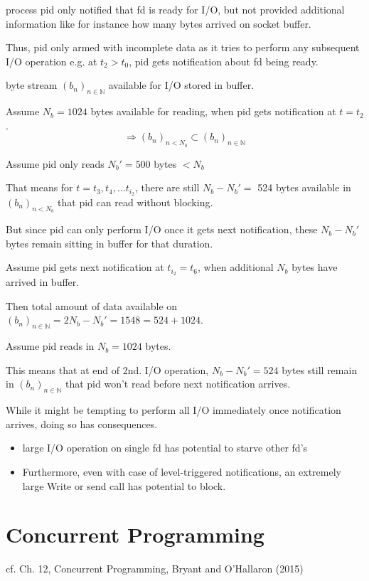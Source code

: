 \documentclass[10pt]{amsart}
\begin{document}
\begin{multicols*}{2}
process pid only notified that fd is ready for I/O, but not provided additional information like for instance how many bytes arrived on socket buffer.

Thus, pid only armed with incomplete data as it tries to perform any subsequent I/O operation 
e.g. 
 at $t_2 > t_0$, pid gets notification about fd being ready.
 
 byte stream $(b_n)_{n\in \mathbb{N}}$ available for I/O stored in buffer.
 
 Assume $N_b = 1024$ bytes available for reading, when pid gets notification at $t= t_2$. 
 \[
 \Longrightarrow (b_n)_{n <N_b} \subset (b_n)_{n\in \mathbb{N}}
 \]
 
Assume pid only reads $N_b' = 500$ bytes $<N_b$

That means for $t=t_3, t_4, \dots t_{i_2}$, there are still $N_b - N_b' = $ 524 bytes available in $(b_n)_{n < N_b}$ that pid can read without blocking.

But since pid can only perform I/O once it gets next notification, these $N_b - N_b'$ bytes remain sitting in buffer for that duration.

Assume pid gets next notification at $t_{i_2} = t_6$, when additional $N_b$ bytes have arrived in buffer.

Then total amount of data available on $(b_n)_{n\in \mathbb{N}} = 2N_b - N_b' = 1548 = 524 + 1024$.

Assume pid reads in $N_b = 1024$ bytes.

This means that at end of 2nd. I/O operation, $N_b - N_b' = 524$ bytes still remain in $(b_n)_{n\in \mathbb{N}}$ that pid won't read before next notification arrives.

While it might be tempting to perform all I/O immediately once notification arrives, doing so has consequences. 
\begin{itemize}
	\item large I/O operation on single fd has potential to starve other fd's 
	\item Furthermore, even with case of level-triggered notifications, an extremely large Write or send call has potential to block.
\end{itemize}

\section{Concurrent Programming}

cf. Ch. 12, Concurrent Programming, Bryant and O'Hallaron (2015) \cite{BrOH2016}


\end{multicols*}
\end{document}
